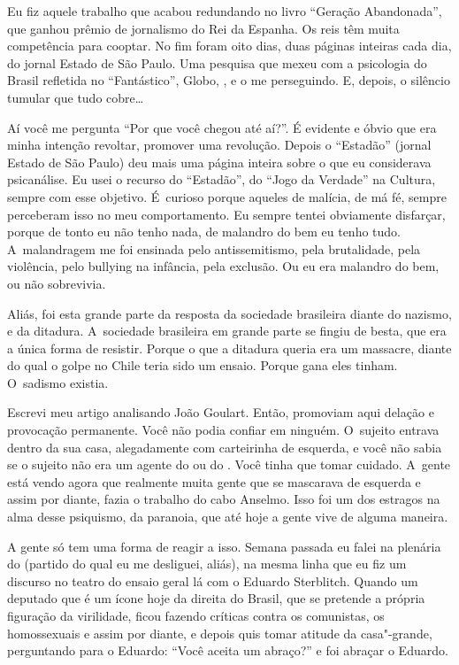 Eu fiz aquele trabalho que acabou redundando no livro ``Geração
Abandonada'', que ganhou prêmio de jornalismo do Rei da Espanha. Os reis
têm muita competência para cooptar. No fim foram oito dias, duas páginas
inteiras cada dia, do jornal Estado de São Paulo. Uma pesquisa que mexeu
com a psicologia do Brasil refletida no ``Fantástico'',  Globo, ,
e o  me perseguindo. E, depois, o silêncio tumular que tudo
cobre…

 

Aí você me pergunta ``Por que você chegou até aí?''. É evidente e óbvio
que era minha intenção revoltar, promover uma revolução. Depois o
``Estadão'' (jornal Estado de São Paulo) deu mais uma página inteira
sobre o que eu considerava psicanálise. Eu usei o recurso do
``Estadão'', do ``Jogo da Verdade'' na  Cultura, sempre com esse
objetivo. É~curioso porque aqueles de malícia, de má fé, sempre
perceberam isso no meu comportamento. Eu sempre tentei obviamente
disfarçar, porque de tonto eu não tenho nada, de malandro do bem eu
tenho tudo. A~malandragem me foi ensinada pelo antissemitismo, pela
brutalidade, pela violência, pelo bullying na infância, pela exclusão.
Ou eu era malandro do bem, ou não sobrevivia.

 

Aliás, foi esta grande parte da resposta da sociedade brasileira diante
do nazismo, e da ditadura. A~sociedade brasileira em grande parte se
fingiu de besta, que era a única forma de resistir. Porque o que a
ditadura queria era um massacre, diante do qual o golpe no Chile teria
sido um ensaio. Porque gana eles tinham. O~sadismo existia.

 

Escrevi meu artigo analisando João Goulart. Então, promoviam aqui delação
e provocação permanente. Você não podia confiar em ninguém. O~sujeito
entrava dentro da sua casa, alegadamente com carteirinha de esquerda, e
você não sabia se o sujeito não era um agente do  ou do . Você
tinha que tomar cuidado. A~gente está vendo agora que realmente muita
gente que se mascarava de esquerda e assim por diante, fazia o trabalho
do cabo Anselmo. Isso foi um dos estragos na alma desse psiquismo, da
paranoia, que até hoje a gente vive de alguma maneira.

 

A gente só tem uma forma de reagir a isso. Semana passada eu falei na
plenária do  (partido do qual eu me desliguei, aliás), na mesma linha
que eu fiz um discurso no teatro do ensaio geral lá com o Eduardo
Sterblitch. Quando um deputado que é um ícone hoje da direita do Brasil,
que se pretende a própria figuração da virilidade, ficou fazendo
críticas contra os comunistas, os homossexuais e assim por diante, e
depois quis tomar atitude da casa"-grande, perguntando para o Eduardo:
``Você aceita um abraço?'' e foi abraçar o Eduardo.

